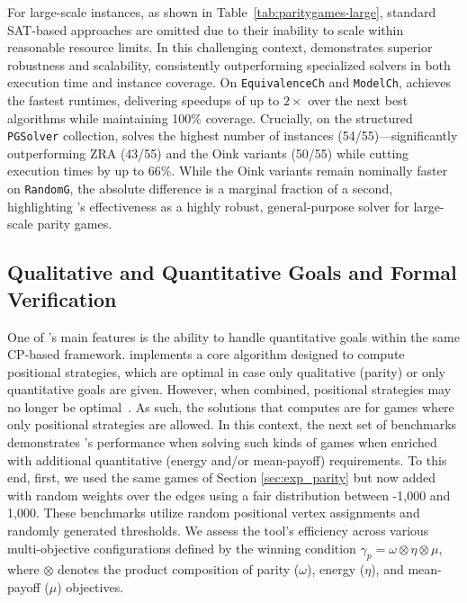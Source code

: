 \documentclass[a4paper,fleqn]{cas-sc}
\begin{document}
For large-scale instances, as shown in Table~\ref{tab:paritygames-large}, standard SAT-based approaches are omitted due to their inability to scale within reasonable resource limits. In this challenging context, \nocq demonstrates superior robustness and scalability, consistently outperforming specialized solvers in both execution time and instance coverage. On \texttt{EquivalenceCh} and \texttt{ModelCh}, \nocq achieves the fastest runtimes, delivering speedups of up to $2\times$ over the next best algorithms while maintaining 100\% coverage. Crucially, on the structured \texttt{PGSolver} collection, \nocq solves the highest number of instances (54/55)—significantly outperforming ZRA (43/55) and the Oink variants (50/55) while cutting execution times by up to 66\%. While the Oink variants remain nominally faster on \texttt{RandomG}, the absolute difference is a marginal fraction of a second, highlighting \nocq's effectiveness as a highly robust, general-purpose solver for large-scale parity games.


\subsection{Qualitative and Quantitative Goals and Formal Verification}\label{sec:exp_quantitative}


One of \nocq's main features is the ability to handle quantitative goals within the same CP-based framework. 
%
\nocq implements a core algorithm designed to compute positional strategies, which are optimal in case only qualitative (parity) or only quantitative goals are given. However, when combined, positional strategies may no longer be optimal~\cite{ChatterjeeHJ05,Chatterjee:2010}. As such, the solutions that \nocq computes are for games where only positional strategies are allowed. 
%
In this context, the next set of benchmarks demonstrates \nocq's performance when solving such kinds of games when enriched with additional quantitative (energy and/or mean-payoff) requirements.  
%
To this end, first, we used the same games of Section \ref{sec:exp_parity} but now added with random weights over the edges using a fair distribution between -1,000 and 1,000. These benchmarks utilize random positional vertex assignments and randomly generated thresholds. We assess the tool's efficiency across various multi-objective configurations defined by the winning condition $\gamma_{p} = \omega \otimes \eta \otimes \mu$, where $\otimes$ denotes the product composition of parity ($\omega$), energy ($\eta$), and mean-payoff ($\mu$) objectives.
\end{document}
